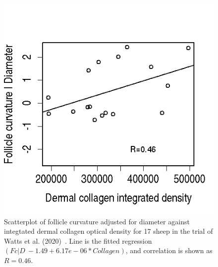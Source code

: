 %

\begin{figure}[]
\centering
    \includegraphics[scale=0.80]{fcadjdcoll.png}
  \caption{Scatterplot of follicle curvature adjusted for diameter against integtated dermal collagen optical density for 17 sheep in the trial of Watts et al. (2020)~\cite{watts-2020}. Line is the fitted regression $(Fc | D ~ -1.49 + 6.17e-06 * Collagen)$, and correlation is shown as $R=0.46$.}
\vfill
  \label{fig:fcadjdxcoll}
\end{figure}

%

